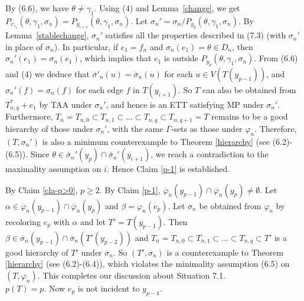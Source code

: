 \documentclass[11pt]{article}
\begin{document}
By (6.6), we have $\theta\neq\gamma_1$. Using (4) and Lemma~\ref{change}, we get $P_{v_{\gamma_1}}(\theta, \gamma_{1},\sigma_n)=P_{y_{i+1}}(\theta, \gamma_{1}, \sigma_n)$.  Let $\sigma_n'=\sigma_n/P_{y_p} (\theta,\gamma_{1},\sigma_n)$.
By Lemma~\ref{stablechange}, $\sigma_n'$ satisfies all the properties described in (7.3) (with $\sigma_n'$ in place of $\sigma_n$). 
In particular, if $e_1=f_n$ and $\sigma_n(e_1)=\theta \in D_n$, then $\sigma_n'(e_1)=\sigma_n(e_1)$, which implies that 
$e_1$ is outside $P_{y_p} (\theta,\gamma_{1},\sigma_n)$. 
From (6.6) and (4) we deduce that $\overline{\sigma}'_n(u)=\overline{\sigma}_n(u)$ for each $u \in V(T(y_{p-1}))$,  
and $\sigma_n'(f)=\sigma_n(f)$ for each edge $f$ in $T(y_{i+1})$. So $T$ can also be obtained from $T_{n,q}^*+e_1$ 
by TAA under $\sigma_n'$, and hence is an ETT satisfying MP under $\sigma_n'$. Furthermore, $T_n=T_{n,0} \subset T_{n,1} \subset 
\ldots \subset T_{n,q}\subset T_{n,q+1}=T$ remains to be a good hierarchy of those under $\sigma_n'$, with the same 
$\Gamma$-sets as those under $\varphi_n$. Therefore, $(T, \sigma_n')$ is also a minimum counterexample to Theorem 
\ref{hierarchy} (see (6.2)-(6.5)). Since $\theta \in\overline{\sigma}_n'(y_p)\cap\overline{\sigma}_n'(y_{i+1})$, 
we reach a contradiction to the maximality assumption on $i$. Hence Claim \ref{p-1} is established.

\vskip 2mm

By Claim \ref{cla-p>0},  $p \ge  2$.  By Claim \ref{p-1}, $\overline{\varphi}_n(y_{p-1})\cap\overline{\varphi}_n(y_p) 
\ne \emptyset$. Let $\alpha \in \overline{\varphi}_n(y_{p-1})\cap\overline{\varphi}_n(y_p)$ and $\beta=\varphi_n(e_{p})$. Let
$\sigma_n$ be obtained from $\varphi_n$ by recoloring $e_p$ with $\alpha$ and let $T'=T(y_{p-1})$. Then
$\beta \in \overline{\sigma}_n(y_{p-1})\cap\overline{\sigma}_n(T'(y_{p-2}))$ and  $T_n=T_{n,0} \subset T_{n,1} \subset 
\ldots \subset T_{n,q}\subset T'$ is a good hierarchy of $T'$ under $\sigma_n$. 
So $(T', \sigma_n)$ is a counterexample to Theorem \ref{hierarchy} (see (6.2)-(6.4)), which violates the 
minimality assumption (6.5) on $(T, \varphi_n)$.  This completes our discussion about Situation 7.1.\\


 $p(T)=p$. Now $e_p$ is not incident to $y_{p-1}$.  

\vskip 2mm
\end{document}
